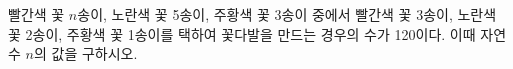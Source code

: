 \hspace*{2mm}\begin{minipage}[t]{\dimexpr\linewidth-2mm\relax}\vspace{0pt}
빨간색 꽃 $n$송이, 노란색 꽃 5송이, 주황색 꽃 3송이 중에서 빨간색 꽃 3송이, 노란색 꽃 2송이, 주황색 꽃 1송이를 택하여 꽃다발을 만드는 경우의 수가 120이다. 이때 자연수 $n$의 값을 구하시오. \end{minipage}
